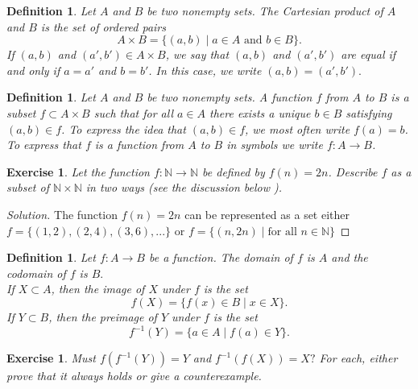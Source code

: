 \documentclass{amsart}
\newtheorem{definition}[theorem]{Definition}
\newtheorem{exercise}[theorem]{Exercise}
\newcommand{\N}{\mathbb N}
\newcommand{\1}{\mathds{1}}
\def \N {{\mathbb {N}}}
\numberwithin{equation}{section}
\numberwithin{theorem}{section}
\begin{document}
\begin{definition}  Let $A$ and $B$ be two nonempty sets. 
The \emph{Cartesian product} of $A$ and $B$ is the set of ordered pairs
\[
A \times B = \{ (a, b) \mid \text{$a \in A$ and $b \in B$} \}.
\]
If $(a, b)$ and $(a', b') \in A \times B$, we say that $(a, b)$ and $(a', b')$ are
\emph{equal} if and only if $a = a'$ and $b = b'$. In this case, we write $
(a, b) = (a', b').$


\end{definition}




\begin{definition} Let $A$ and $B$ be two nonempty sets.  
A \emph{function} $f$ from $A$ to $B$ is a subset $f \subset A \times B$ such that for all $a \in A$ there exists a unique $b \in B$ satisfying $(a, b) \in f$.  To express the idea that $(a, b) \in f$, we most
often write $f(a) = b$.  To express that $f$ is a function from $A$ to $B$ in symbols we write $f \colon A \rightarrow B$.  
\end{definition}


\begin{exercise}  
Let the function $f \colon \N \rightarrow \N$ be defined by
$f(n)=2n$.  Describe $f$ as a subset of $\N\times \N$ in two ways (see the discussion below ). 

\end{exercise}

\begin{proof}[Solution]
	The function $f(n)=2n$ can be represented as a set either $f = \{(1,2) ,(2,4), (3,6), ...\}\text{ or } f = \{(n,2n)\mid\text{for all } n\in \N\} $
	
\end{proof}

\begin{definition}  Let $f \colon A \rightarrow B$ be a function.  The \emph{domain} of $f$ is $A$ and the \emph{codomain} of $f$ is $B.$\\
If $X \subset A$, then the \emph{image of $X$ under $f$} is the set
\[
f(X) = \{ f(x) \in B \mid  x \in X \}.
\]
If $Y \subset B$, then the \emph{preimage of $Y$ under $f$} is the set
\[
f^{-1}(Y) = \{ a \in A \mid f(a) \in Y \}.
\]
\end{definition}

\begin{exercise}
Must $f(f^{-1}(Y))=Y$ and $f^{-1}(f(X))=X?$ For each, either prove that it always holds or give a counterexample.

\end{exercise}
\end{document}
